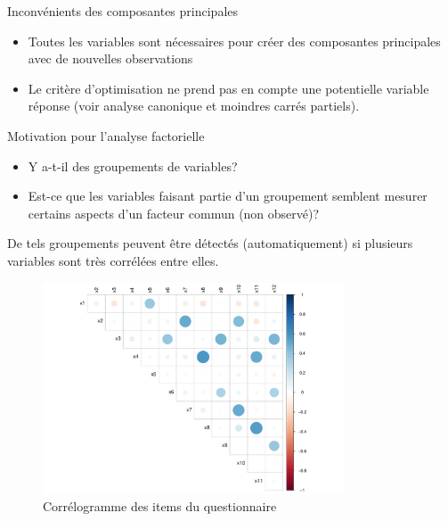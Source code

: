 \documentclass[
  ignorenonframetext,
]{beamer}
\providecommand{\tightlist}{%
  \setlength{\itemsep}{0pt}\setlength{\parskip}{0pt}}\usepackage{longtable,booktabs,array}
\begin{document}
\begin{frame}{Inconvénients des composantes principales}
\protect\hypertarget{inconvuxe9nients-des-composantes-principales}{}
\begin{itemize}
\tightlist
\item
  Toutes les variables sont nécessaires pour créer des composantes
  principales avec de nouvelles observations
\item
  Le critère d'optimisation ne prend pas en compte une potentielle
  variable réponse (voir analyse canonique et moindres carrés partiels).
\end{itemize}
\end{frame}

\begin{frame}{Motivation pour l'analyse factorielle}
\protect\hypertarget{motivation-pour-lanalyse-factorielle}{}
\begin{itemize}
\tightlist
\item
  Y a-t-il des groupements de variables?
\item
  Est-ce que les variables faisant partie d'un groupement semblent
  mesurer certains aspects d'un facteur commun (non observé)?
\end{itemize}

De tels groupements peuvent être détectés (automatiquement) si plusieurs
variables sont très corrélées entre elles.
\end{frame}

\begin{frame}
\begin{figure}

{\centering \includegraphics[width=0.8\textwidth,height=\textheight]{MATH60602-diapos10_files/figure-beamer/fig-correlogram-1.pdf}

}

\caption{\label{fig-correlogram}Corrélogramme des items du
questionnaire}

\end{figure}
\end{frame}
\end{document}
